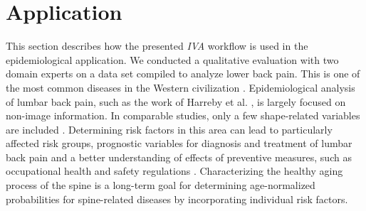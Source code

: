 \documentclass[journal]{style/vgtc} 			          %
\begin{document}
\section{Application} \label{application}
This section describes how the presented \emph{IVA} workflow is used in the epidemiological application.
%
We conducted a qualitative evaluation with two domain experts on a data set compiled to analyze lower back pain. 
%
This is one of the most common diseases in the Western civilization \cite{Backpain}.
%
Epidemiological analysis of lumbar back pain, such as the work of Harreby et al. \cite{Harreby1996}, is largely focused on non-image information.
%
In comparable studies, only a few shape-related variables are included \cite{Lang2011}.
%
%
Determining risk factors in this area can lead to particularly affected risk groups, prognostic variables for diagnosis and treatment of lumbar back pain and a better understanding of effects of preventive measures, such as occupational health and safety regulations \cite{Fletcher2012}.
%
Characterizing the healthy aging process of the spine is a long-term goal for determining age-normalized probabilities for spine-related diseases by incorporating individual risk factors.
%
\end{document}
